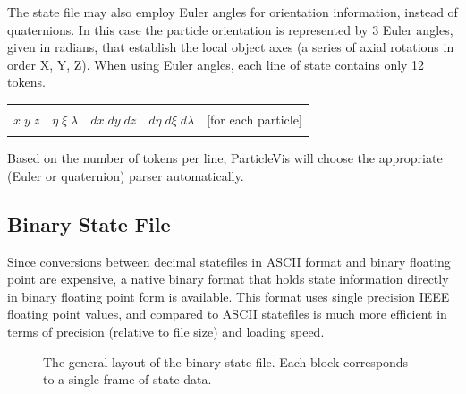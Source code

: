 The state file may also employ Euler angles for orientation information, instead of quaternions.  In this case the particle orientation is represented by 3 Euler angles, given in radians, that establish the local object axes (a series of axial rotations in order X, Y, Z).  When using Euler angles, each line of state contains only 12 tokens.

\begin{tabular}{l l l l l}
	& & & & \\
	$x \; y \; z$ & $\eta \; \xi \; \lambda$ & $dx \; dy \; dz$ & $d\eta \; d\xi \; d\lambda$ & [for each particle]\\
	& & & & \\
\end{tabular}

Based on the number of tokens per line, ParticleVis will choose the appropriate (Euler or quaternion) parser automatically.

\subsection{Binary State File}

Since conversions between decimal statefiles in ASCII format and binary floating point are expensive, a native binary format that holds state information
directly in binary floating point form is available.  This format uses single precision IEEE floating point values,
and compared to ASCII statefiles is much more efficient in terms of precision (relative to file size) and loading speed.

\begin{figure}[hb]
\centering
{}
\caption[The general layout of the binary state file]{The general layout of the binary state file.  Each block corresponds to a single frame of state data.}
\label{binary-layout}
\end{figure}

